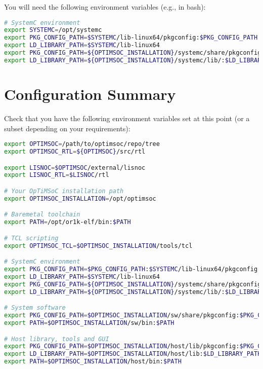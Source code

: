 You will need the following environment variables (e.g., in bash):

\begin{lstlisting}[language=bash]
# SystemC environment
export SYSTEMC=/opt/systemc
export PKG_CONFIG_PATH=$SYSTEMC/lib-linux64/pkgconfig:$PKG_CONFIG_PATH
export LD_LIBRARY_PATH=$SYSTEMC/lib-linux64
export PKG_CONFIG_PATH=${OPTIMSOC_INSTALLATION}/systemc/share/pkgconfig:$PKG_CONFIG_PATH
export LD_LIBRARY_PATH=${OPTIMSOC_INSTALLATION}/systemc/lib/:$LD_LIBRARY_PATH
\end{lstlisting}

\section{Configuration Summary}

Check that you have the following environment variables set at this
point (or a subset depending on your requirements):

\begin{lstlisting}[language=bash]
export OPTIMSOC=/path/to/optimsoc/repo/tree
export OPTIMSOC_RTL=${OPTIMSOC}/src/rtl

export LISNOC=$OPTIMSOC/external/lisnoc
export LISNOC_RTL=$LISNOC/rtl

# Your OpTiMSoC installation path
export OPTIMSOC_INSTALLATION=/opt/optimsoc

# Baremetal toolchain
export PATH=/opt/or1k-elf/bin:$PATH

# TCL scripting
export OPTIMSOC_TCL=$OPTIMSOC_INSTALLATION/tools/tcl

# SystemC environment
export PKG_CONFIG_PATH=$PKG_CONFIG_PATH:$SYSTEMC/lib-linux64/pkgconfig
export LD_LIBRARY_PATH=$SYSTEMC/lib-linux64
export PKG_CONFIG_PATH=${OPTIMSOC_INSTALLATION}/systemc/share/pkgconfig:$PKG_CONFIG_PATH
export LD_LIBRARY_PATH=${OPTIMSOC_INSTALLATION}/systemc/lib/:$LD_LIBRARY_PATH

# System software
export PKG_CONFIG_PATH=$OPTIMSOC_INSTALLATION/sw/share/pkgconfig:$PKG_CONFIG_PATH
export PATH=$OPTIMSOC_INSTALLATION/sw/bin:$PATH

# Host library, tools and GUI
export PKG_CONFIG_PATH=$OPTIMSOC_INSTALLATION/host/lib/pkgconfig:$PKG_CONFIG_PATH
export LD_LIBRARY_PATH=$OPTIMSOC_INSTALLATION/host/lib:$LD_LIBRARY_PATH
export PATH=$OPTIMSOC_INSTALLATION/host/bin:$PATH
\end{lstlisting}
